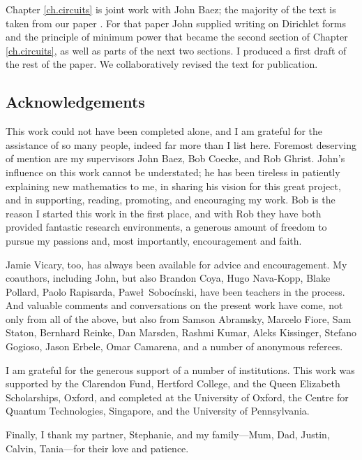 Chapter \ref{ch.circuits} is joint work with John Baez; the majority of the text
is taken from our paper \cite{BF}. For that paper John supplied writing on
Dirichlet forms and the principle of minimum power that became the second
section of Chapter \ref{ch.circuits}, as well as parts of the next two sections.
I produced a first draft of the rest of the paper. We collaboratively revised
the text for publication.

\subsection*{Acknowledgements}
This work could not have been completed alone, and I am grateful for the
assistance of so many people, indeed far more than I list here. Foremost
deserving of mention are my supervisors John Baez, Bob Coecke, and Rob Ghrist.
John's influence on this work cannot be understated; he has been tireless in
patiently explaining new mathematics to me, in sharing his vision for this great
project, and in supporting, reading, promoting, and encouraging my work. Bob is
the reason I started this work in the first place, and with Rob they have both
provided fantastic research environments, a generous amount of freedom to pursue
my passions and, most importantly, encouragement and faith.

Jamie Vicary, too, has always been available for advice and encouragement. My
coauthors, including John, but also Brandon Coya, Hugo Nava-Kopp, Blake Pollard,
Paolo Rapisarda, Pawe\l\ Soboc\'inski, have been teachers in the process.  And
valuable comments and conversations on the present work have come, not only from
all of the above, but also from Samson Abramsky, Marcelo Fiore, Sam Staton,
Bernhard Reinke, Dan Marsden, Rashmi Kumar, Aleks Kissinger, Stefano Gogioso,
Jason Erbele, Omar Camarena, and a number of anonymous referees.

I am grateful for the generous support of a number of institutions.  This work
was supported by the Clarendon Fund, Hertford College, and the Queen Elizabeth
Scholarships, Oxford, and completed at the University of Oxford, the Centre for
Quantum Technologies, Singapore, and the University of Pennsylvania.

Finally, I thank my partner, Stephanie, and my family---Mum, Dad, Justin,
Calvin, Tania---for their love and patience.

